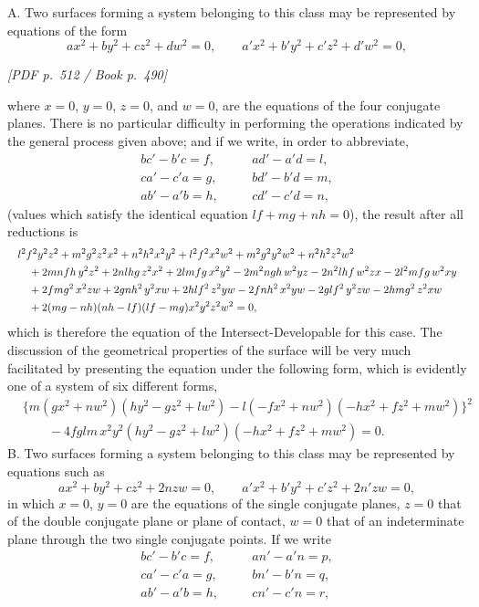 \documentclass[11pt]{article}
\newcommand{\Page}[2]{\bigskip\noindent\textit{[PDF p.~#1 / Book p.~#2]}\par\smallskip}
\begin{document}
A. Two surfaces forming a system belonging to this class may be represented by
equations of the form
\[
        ax^2+by^2+cz^2+dw^2=0,\qquad
        a'x^2+b'y^2+c'z^2+d'w^2=0,
\]

\Page{512}{490}

\noindent where $x=0$, $y=0$, $z=0$, and $w=0$, are the equations of the four conjugate
planes. There is no particular difficulty in performing the operations indicated by the
general process given above; and if we write, in order to abbreviate,
\[
\begin{array}{lll}
bc'-b'c=f,&\quad&ad'-a'd=l,\\
ca'-c'a=g,&&bd'-b'd=m,\\
ab'-a'b=h,&&cd'-c'd=n,
\end{array}
\]
(values which satisfy the identical equation $lf+mg+nh=0$), the result after all
reductions is
\[
\resizebox{\textwidth}{!}{$\displaystyle
\begin{aligned}
&l^2f^2y^2z^2+m^2g^2z^2x^2+n^2h^2x^2y^2+l^2f^2x^2w^2
 +m^2g^2y^2w^2+n^2h^2z^2w^2\\
&\quad+2mnfh\,y^2z^2+2nlhg\,z^2x^2+2lmfg\,x^2y^2
-2m^2ngh\,w^2yz-2n^2lhf\,w^2zx-2l^2mfg\,w^2xy\\
&\quad+2fmg^2\,x^2zw+2gnh^2\,y^2xw+2hlf^2\,z^2yw
-2fnh^2\,x^2y w-2glf^2\,y^2z w-2hmg^2\,z^2x w\\
&\quad+2(mg-nh)(nh-lf)(lf-mg)x^2y^2z^2w^2=0,
\end{aligned}$}
\]
which is therefore the equation of the Intersect-Developable for this case. The
discussion of the geometrical properties of the surface will be very much facilitated
by presenting the equation under the following form, which is evidently one of a
system of six different forms,
\[
\begin{aligned}
&\{m(gx^2+nw^2)(hy^2-gz^2+lw^2)
 -l(-fx^2+nw^2)(-hx^2+fz^2+mw^2)\}^2\\
&\qquad -4fglm\,x^2y^2(hy^2-gz^2+lw^2)(-hx^2+fz^2+mw^2)=0.
\end{aligned}
\]
B. Two surfaces forming a system belonging to this class may be represented by
equations such as
\[
        ax^2+by^2+cz^2+2nzw=0,\qquad
        a'x^2+b'y^2+c'z^2+2n'zw=0,
\]
in which $x=0$, $y=0$ are the equations of the single conjugate planes, $z=0$ that
of the double conjugate plane or plane of contact, $w=0$ that of an indeterminate
plane through the two single conjugate points. If we write
\[
\begin{array}{lll}
bc'-b'c=f,&\quad&an'-a'n=p,\\
ca'-c'a=g,&&bn'-b'n=q,\\
ab'-a'b=h,&&cn'-c'n=r,
\end{array}
\]
\end{document}
